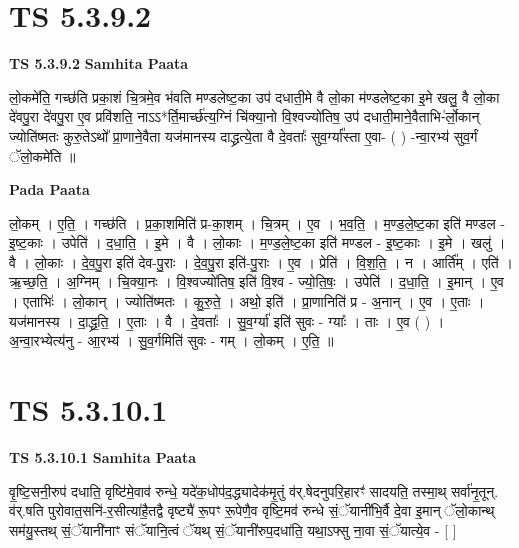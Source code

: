 \documentclass[17pt]{extarticle}
\begin{document}

\section{ TS 5.3.9.2 }

\textbf{TS 5.3.9.2 } \newline
\textbf{Samhita Paata} \newline

लो॒कमे॑ति॒ गच्छ॑ति प्रका॒शं चि॒त्रमे॒व भ॑वति मण्डलेष्ट॒का उप॑ दधाती॒मे वै लो॒का म॑ण्डलेष्ट॒का इ॒मे खलु॒ वै लो॒का दे॑वपु॒रा दे॑वपु॒रा ए॒व प्रवि॑शति॒ नाऽऽ*र्ति॒मार्च्छ॑त्य॒ग्निं चि॑क्या॒नो वि॒श्वज्यो॑तिष॒ उप॑ दधाती॒माने॒वैताभि-॑र्लो॒कान् ज्योति॑ष्मतः कुरु॒तेऽथो᳚ प्रा॒णाने॒वैता यज॑मानस्य दाद्ध्रत्ये॒ता वै दे॒वताः᳚ सुव॒र्ग्या᳚स्ता ए॒वा- ( ) -न्वा॒रभ्य॑ सुव॒र्गं ॅलो॒कमे॑ति ॥ \newline

\textbf{Pada Paata} \newline

लो॒कम् । ए॒ति॒ । गच्छ॑ति । प्र॒का॒शमिति॑ प्र-का॒शम् । चि॒त्रम् । ए॒व । भ॒व॒ति॒ । म॒ण्ड॒ले॒ष्ट॒का इति॑ मण्डल - इ॒ष्ट॒काः । उपेति॑ । द॒धा॒ति॒ । इ॒मे । वै । लो॒काः । म॒ण्ड॒ले॒ष्ट॒का इति॑ मण्डल - इ॒ष्ट॒काः । इ॒मे । खलु॑ । वै । लो॒काः । दे॒व॒पु॒रा इति॑ देव-पु॒राः । दे॒व॒पु॒रा इति॑-पु॒राः । ए॒व । प्रेति॑ । वि॒श॒ति॒ । न । आर्ति᳚म् । एति॑ । ऋ॒च्छ॒ति॒ । अ॒ग्निम् । चि॒क्या॒नः । वि॒श्वज्यो॑तिष॒ इति॑ वि॒श्व - ज्यो॒ति॒षः॒ । उपेति॑ । द॒धा॒ति॒ । इ॒मान् । ए॒व । एताभिः॑ । लो॒कान् । ज्योति॑ष्मतः । कु॒रु॒ते॒ । अथो॒ इति॑ । प्रा॒णानिति॑ प्र - अ॒नान् । ए॒व । ए॒ताः । यज॑मानस्य । दा॒द्ध्र॒ति॒ । ए॒ताः । वै । दे॒वताः᳚ । सु॒व॒र्ग्या॑ इति॑ सुवः - ग्याः᳚ । ताः । ए॒व ( ) । अ॒न्वा॒रभ्येत्य॑नु - आ॒रभ्य॑ । सु॒व॒र्गमिति॑ सुवः - गम् । लो॒कम् । ए॒ति॒ ॥  \newline





\section{ TS 5.3.10.1 }

\textbf{TS 5.3.10.1 } \newline
\textbf{Samhita Paata} \newline

वृ॒ष्टि॒सनी॒रुप॑ दधाति॒ वृष्टि॑मे॒वाव॑ रुन्धे॒ यदे॑क॒धोप॑द॒द्ध्यादेक॑मृ॒तुं व॑र्.षेदनुपरि॒हारꣳ॑ सादयति॒ तस्मा॒थ् सर्वा॑नृ॒तून्. व॑र्.षति पुरोवात॒सनि॑-र॒सीत्या॑है॒तद्वै वृष्ट्यै॑ रू॒पꣳ रू॒पेणै॒व वृष्टि॒मव॑ रुन्धे सं॒ॅयानी॑भि॒र्वै दे॒वा इ॒मान् ॅलो॒कान्थ् सम॑यु॒स्तथ् सं॒ॅयानी॑नाꣳ संॅयानि॒त्वं ॅयथ् सं॒ॅयानी॑रुप॒दधा॑ति॒ यथा॒ऽफ्सु ना॒वा सं॒ॅयात्ये॒व - [  ] \newline
\end{document}
